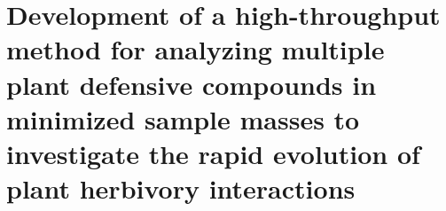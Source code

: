 \documentclass[PhD]{msu-thesis}
\begin{document}
\chapter{Development of a high-throughput method for analyzing multiple plant defensive compounds in minimized sample masses to investigate the rapid evolution of plant herbivory interactions}
%
%
%
%
%
%
%
%
%
%
%
\makebibliographypage %
%
%
%
%
%
\end{document}
